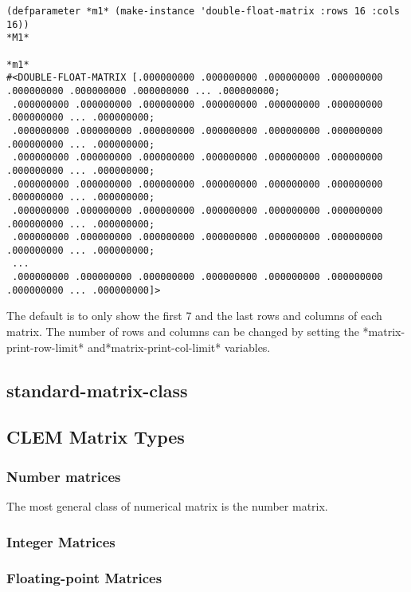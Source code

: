 \documentclass[10pt]{article}
\begin{document}
\baselineskip12pt
\begin{verbatim}(defparameter *m1* (make-instance 'double-float-matrix :rows 16 :cols 16))
*M1*

*m1*
#<DOUBLE-FLOAT-MATRIX [.000000000 .000000000 .000000000 .000000000 .000000000 .000000000 .000000000 ... .000000000; 
 .000000000 .000000000 .000000000 .000000000 .000000000 .000000000 .000000000 ... .000000000; 
 .000000000 .000000000 .000000000 .000000000 .000000000 .000000000 .000000000 ... .000000000; 
 .000000000 .000000000 .000000000 .000000000 .000000000 .000000000 .000000000 ... .000000000; 
 .000000000 .000000000 .000000000 .000000000 .000000000 .000000000 .000000000 ... .000000000; 
 .000000000 .000000000 .000000000 .000000000 .000000000 .000000000 .000000000 ... .000000000; 
 .000000000 .000000000 .000000000 .000000000 .000000000 .000000000 .000000000 ... .000000000;
 ... 
 .000000000 .000000000 .000000000 .000000000 .000000000 .000000000 .000000000 ... .000000000]>

\end{verbatim}
\baselineskip14pt
The default is to only show the first 7 and the last rows
 and columns of each matrix. The number of rows and columns can
 be changed by setting the *matrix-print-row-limit* and*matrix-print-col-limit* variables.

\baselineskip12pt
\subsection{standard-matrix-class}
\baselineskip14pt
\baselineskip12pt
\subsection{CLEM Matrix Types}
\baselineskip14pt
\baselineskip12pt
\subsubsection{Number matrices}
\baselineskip14pt
The most general class of numerical matrix is the number matrix.

\baselineskip12pt
\subsubsection{Integer Matrices}
\baselineskip14pt
\baselineskip12pt
\subsubsection{Floating-point Matrices}
\baselineskip14pt
\baselineskip12pt
\end{document}
